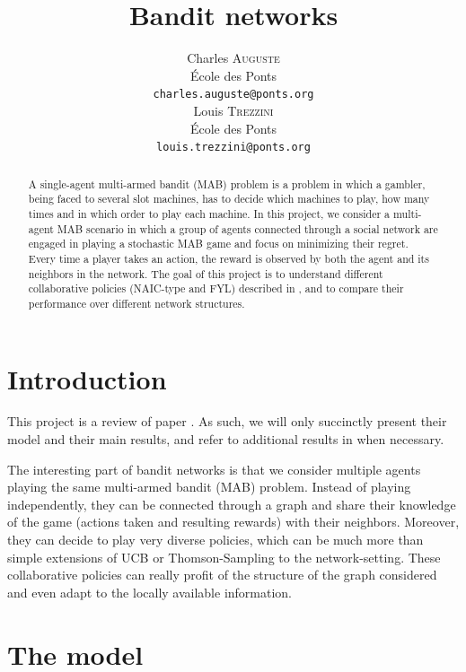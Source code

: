 \documentclass{article}
\title{Bandit networks}
\author{%
  Charles \textsc{Auguste} \\
  École des Ponts \\
  \texttt{charles.auguste@ponts.org} \\
  \And
  Louis \textsc{Trezzini} \\
  École des Ponts \\
  \texttt{louis.trezzini@ponts.org} \\
}
\begin{document}
\maketitle

\begin{abstract}
  A single-agent multi-armed bandit (MAB) problem is a problem in which a gambler, being faced to several slot machines, has to decide which machines to play, how many times and in which order to play each machine.
  In this project, we consider a multi-agent MAB scenario in which a group of agents connected through a social network are engaged in playing a stochastic MAB game and focus on minimizing their regret. Every time a player takes an action, the reward is observed by both the agent and its neighbors in the network.
  The goal of this project is to understand different collaborative policies (NAIC-type and FYL) described in \cite{DBLP:journals/corr/KollaJG16}, and to compare their performance over different network structures.
\end{abstract}

\section{Introduction}
This project is a review of paper \cite{DBLP:journals/corr/KollaJG16}. As such, we will only succinctly present their model and their main results, and refer to additional results in \cite{DBLP:journals/corr/KollaJG16} when necessary.

The interesting part of bandit networks is that we consider multiple agents playing the same multi-armed bandit (MAB) problem. Instead of playing independently, they can be connected through a graph and share their knowledge of the game (actions taken and resulting rewards) with their neighbors. Moreover, they can decide to play very diverse policies, which can be much more than simple extensions of UCB or Thomson-Sampling to the network-setting. These collaborative policies can really profit of the structure of the graph considered and even adapt to the locally available information.

\section{The model}
\end{document}
